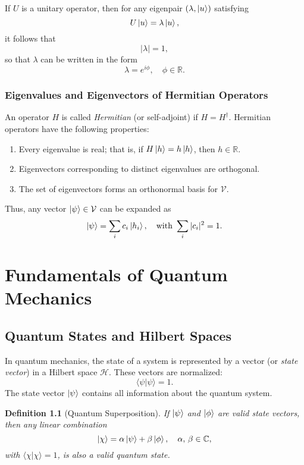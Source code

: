 \documentclass[12pt,oneside]{book}
\newtheorem{definition}[theorem]{Definition}
\theoremstyle{remark}
\begin{document}
	If \( U \) is a unitary operator, then for any eigenpair \( (\lambda, \ket{u}) \) satisfying
	\[
	U\ket{u} = \lambda \ket{u},
	\]
	it follows that
	\[
	|\lambda| = 1,
	\]
	so that \( \lambda \) can be written in the form
	\[
	\lambda = e^{i\phi}, \quad \phi\in\mathbb{R}.
	\]
	
	\subsection{Eigenvalues and Eigenvectors of Hermitian Operators}
	
	An operator \( H \) is called \emph{Hermitian} (or self-adjoint) if \( H = H^\dagger \). Hermitian operators have the following properties:
	\begin{enumerate}[label=(\roman*)]
		\item Every eigenvalue is real; that is, if \( H\ket{h} = h\ket{h} \), then \( h\in\mathbb{R} \).
		\item Eigenvectors corresponding to distinct eigenvalues are orthogonal.
		\item The set of eigenvectors forms an orthonormal basis for \( \mathcal{V} \).
	\end{enumerate}
	Thus, any vector \( \ket{\psi} \in \mathcal{V} \) can be expanded as
	\[
	\ket{\psi} = \sum_i c_i \ket{h_i}, \quad \text{with } \sum_i |c_i|^2 = 1.
	\]
	
	\chapter{Fundamentals of Quantum Mechanics}
	
	\section{Quantum States and Hilbert Spaces}
	
	In quantum mechanics, the state of a system is represented by a vector (or \emph{state vector}) in a Hilbert space \( \mathcal{H} \). These vectors are normalized:
	\[
	\langle \psi | \psi \rangle = 1.
	\]
	The state vector \( \ket{\psi} \) contains all information about the quantum system.
	
	\begin{definition}[Quantum Superposition]
		If \( \ket{\psi} \) and \( \ket{\phi} \) are valid state vectors, then any linear combination
		\[
		\ket{\chi} = \alpha \ket{\psi} + \beta \ket{\phi}, \quad \alpha,\,\beta \in \mathbb{C},
		\]
		with \( \langle \chi | \chi \rangle = 1 \), is also a valid quantum state.
	\end{definition}
	
\end{document}
